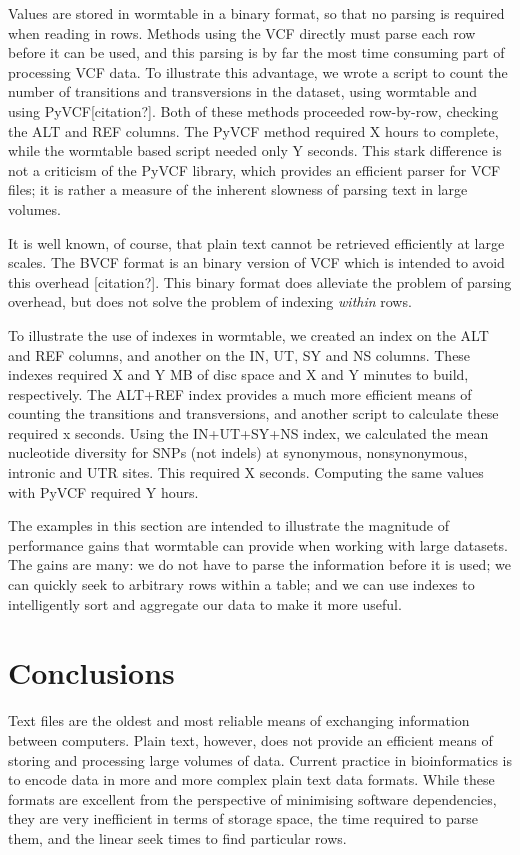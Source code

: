 \documentclass{bioinfo}
\begin{document}
Values are stored in wormtable in a binary format, so that no parsing is
required when reading in rows. Methods using the VCF directly must parse 
each row before it can be used, and this parsing is by far the most time 
consuming part of processing VCF data. To illustrate this advantage, we
wrote a script to count the number of transitions and transversions
in the dataset, using wormtable and using PyVCF[citation?]. Both of these
methods proceeded row-by-row, checking the ALT and REF columns. The 
PyVCF method required X hours to complete, while the wormtable 
based script needed only Y seconds. This stark difference is not a 
criticism of the PyVCF library, which provides an efficient parser 
for VCF files; it is rather a measure of the inherent slowness of
parsing text in large volumes.

It is well known, of course, that plain text cannot be retrieved 
efficiently at large scales. The BVCF format is an binary version 
of VCF which is intended to avoid this overhead [citation?]. 
This binary format does alleviate the problem of parsing overhead,
but does not solve the problem of indexing \emph{within} rows.

To illustrate the use of indexes in wormtable, 
we created an index on the ALT and REF columns, 
and another on the IN, UT, SY and NS columns. These indexes required 
X and Y MB of disc space and X and Y minutes to build, respectively. 
The ALT+REF index provides a much more efficient means of counting 
the transitions and transversions, and another script to calculate 
these required x seconds. Using the IN+UT+SY+NS index, we 
calculated the mean nucleotide diversity for SNPs (not indels) 
at synonymous, nonsynonymous, intronic and UTR sites. This required 
X seconds. Computing the same values with PyVCF required Y hours.

The examples in this section are intended to illustrate the 
magnitude of performance gains that wormtable can provide 
when working with large datasets. The gains are many: we 
do not have to parse the information before it is used;
we can quickly seek to arbitrary rows within a table; and 
we can use indexes to intelligently sort and aggregate our
data to make it more useful.

\section{Conclusions}
Text files are the oldest and most reliable means of exchanging 
information between computers. Plain text, however, does not provide an efficient 
means of storing and processing large volumes of data. Current practice 
in bioinformatics is to encode data in more and more complex plain 
text data formats. While these formats are excellent from the perspective 
of minimising software dependencies, they are very inefficient in terms of 
storage space, the time required to parse them, and the linear
seek times to find particular rows.
\end{document}
